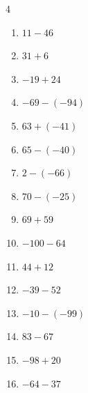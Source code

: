 \begin{multicols}{4}
\begin{enumerate}
        \phantom{$=-147$}

  \item $11-46$

        \phantom{$=-35$}

  \item $31+6$

        \phantom{$=37$}

  \item $-19+24$

        \phantom{$=5$}

  \item $-69-(-94)$

        \phantom{$=25$}

  \item $63+(-41)$

        \phantom{$=22$}

  \item $65-(-40)$

        \phantom{$=105$}

  \item $2-(-66)$

        \phantom{$=68$}

  \item $70-(-25)$

        \phantom{$=95$}

\columnbreak %

  \item $69+59$

        \phantom{$=128$}

  \item $-100-64$

        \phantom{$=-164$}

  \item $44+12$

        \phantom{$=56$}

  \item $-39-52$

        \phantom{$=-91$}

  \item $-10-(-99)$

        \phantom{$=89$}

  \item $83-67$

        \phantom{$=16$}

  \item $-98+20$

        \phantom{$=-78$}

  \item $-64-37$


\end{enumerate}
\end{multicols}
